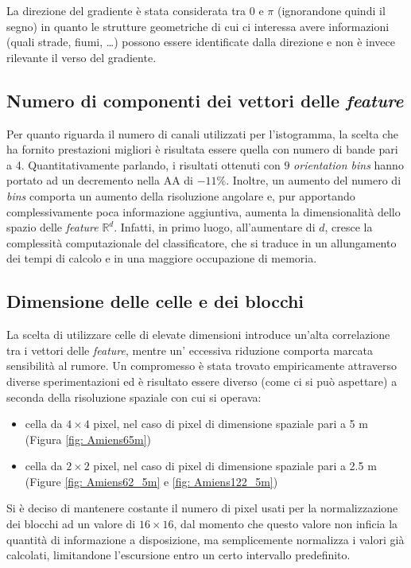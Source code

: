 La direzione del gradiente è stata considerata tra $0$ e $\pi$ (ignorandone quindi il segno) in quanto le strutture geometriche di cui ci interessa avere informazioni (quali strade, fiumi, \ldots) possono essere identificate dalla direzione e non è invece rilevante il verso del gradiente.

\subsection{Numero di componenti dei vettori delle \emph{feature}}
Per quanto riguarda il numero di canali utilizzati per l'istogramma, la scelta che ha fornito prestazioni migliori è risultata essere quella con numero di bande pari a 4. Quantitativamente parlando, i risultati ottenuti con $9$ \emph{orientation bins} hanno portato ad un decremento nella AA di $-11\%$. Inoltre, un aumento del numero di \emph{bins} comporta un aumento della risoluzione angolare e, pur apportando complessivamente poca informazione aggiuntiva, aumenta la dimensionalità dello spazio delle \emph{feature} $\mathbb{R}^d$. Infatti, in primo luogo, all'aumentare di $d$, cresce la complessità computazionale del classificatore, che si traduce in un allungamento dei tempi di calcolo e in una maggiore occupazione di memoria.

\subsection{Dimensione delle celle e dei blocchi}
La scelta di utilizzare celle di elevate dimensioni introduce un'alta correlazione tra i vettori delle \emph{feature}, mentre un' eccessiva riduzione comporta marcata sensibilità al rumore. Un compromesso  è stata trovato empiricamente attraverso diverse sperimentazioni ed è risultato essere diverso (come ci si può aspettare) a seconda della risoluzione spaziale con cui si operava:
\begin{itemize}
\item cella da $4\times 4$ pixel, nel caso di pixel di dimensione spaziale pari a 5 m (Figura \ref{fig: Amiens65m})
\item cella da $2 \times 2$ pixel, nel caso di pixel di dimensione spaziale pari a 2.5 m (Figure \ref{fig: Amiens62_5m} e \ref{fig: Amiens122_5m})
\end{itemize}

Si è deciso di mantenere costante il numero di pixel usati per la normalizzazione dei blocchi ad un valore di $16\times16$, dal momento che questo valore non inficia la quantità di informazione a disposizione, ma semplicemente normalizza i valori già calcolati, limitandone l'escursione entro un certo intervallo predefinito.

